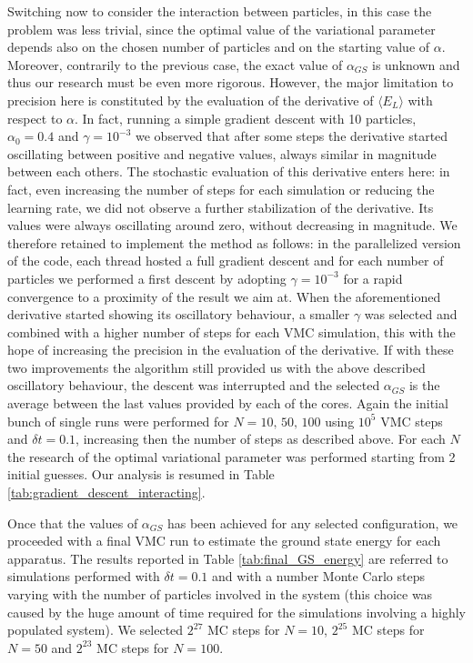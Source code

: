 Switching now to consider the interaction between particles, in this case the problem was less trivial, since the optimal value of the variational parameter depends also on the chosen number of particles and on the starting value of $\alpha$. Moreover, contrarily to the previous case, the exact value of $\alpha_{GS}$ is unknown and thus our research must be even more rigorous. However, the major limitation to precision here is constituted by the evaluation of the derivative of $\langle E_L \rangle$ with respect to $\alpha$. In fact, running a simple gradient descent with 10 particles, $\alpha_0=0.4$ and $\gamma=10^{-3}$ we observed that after some steps the derivative started oscillating between positive and negative values, always similar in magnitude between each others. The stochastic evaluation of this derivative enters here: in fact, even increasing the number of steps for each simulation or reducing the learning rate, we did not observe a further stabilization of the derivative. Its values were always oscillating around zero, without decreasing in magnitude. We therefore retained to implement the method as follows: in the parallelized version of the code, each thread hosted a full gradient descent and for each number of particles we performed a first descent by adopting $\gamma=10^{-3}$ for a rapid convergence to a proximity of the result we aim at. When the aforementioned derivative started showing its oscillatory behaviour, a smaller $\gamma$ was selected and combined with a higher number of steps for each VMC simulation, this with the hope of increasing the precision in the evaluation of the derivative. If with these two improvements the algorithm still provided us with the above described oscillatory behaviour, the descent was interrupted and the selected $\alpha_{GS}$ is the average between the last values provided by each of the cores. Again the initial bunch of single runs were performed for $N=10,\,50,\,100$ using $10^5$ VMC steps and $\delta t =0.1$, increasing then the number of steps as described above. For each $N$ the research of the optimal variational parameter was performed starting from 2 initial guesses. Our analysis is resumed in Table \ref{tab:gradient_descent_interacting}.

Once that the values of $\alpha_{GS}$ has been achieved for any selected configuration, we proceeded with a final VMC run to estimate the ground state energy for each apparatus. The results reported in Table \ref{tab:final_GS_energy} are referred to simulations performed with $\delta t = 0.1$ and with a number Monte Carlo steps varying with the number of particles involved in the system (this choice was caused by the huge amount of time required for the simulations involving a highly populated system). We selected $2^{27}$ MC steps for $N=10$, $2^{25}$ MC steps for $N=50$ and $2^{23}$ MC steps for $N=100$. 




